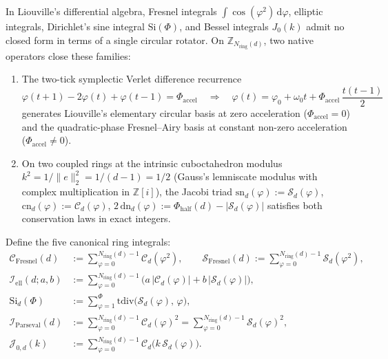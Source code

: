 \documentclass[11pt,a4paper]{article}
\theoremstyle{plain}
\theoremstyle{definition}
\begin{document}
In Liouville's differential algebra, Fresnel integrals $\int\cos(\varphi^2)\,\mathrm{d}\varphi$, elliptic integrals, Dirichlet's sine integral $\mathrm{Si}(\Phi)$, and Bessel integrals $J_0(k)$ admit no closed form in terms of a single circular rotator. On $\mathbb{Z}_{N_{\mathrm{ring}}(d)}$, two native operators close these families:
\begin{enumerate}[leftmargin=*,noitemsep]
\item The two-tick symplectic Verlet difference recurrence
  \begin{equation}
    \label{eq:verlet-parabola}
    \varphi(t+1) - 2\varphi(t) + \varphi(t-1) = \Phi_{\mathrm{accel}}
    \quad\Longrightarrow\quad
    \varphi(t) = \varphi_0 + \omega_0 t + \Phi_{\mathrm{accel}}\,\frac{t(t-1)}{2}
  \end{equation}
  generates Liouville's elementary circular basis at zero acceleration ($\Phi_{\mathrm{accel}}=0$) and the quadratic-phase Fresnel--Airy basis at constant non-zero acceleration ($\Phi_{\mathrm{accel}}\ne 0$).
\item On two coupled rings at the intrinsic cuboctahedron modulus $k^2 = 1/\|e\|_2^2 = 1/(d-1) = 1/2$ (Gauss's lemniscate modulus with complex multiplication in $\mathbb{Z}[i]$), the Jacobi triad $\mathrm{sn}_d(\varphi):=\mathcal{S}_d(\varphi)$, $\mathrm{cn}_d(\varphi):=\mathcal{C}_d(\varphi)$, $2\,\mathrm{dn}_d(\varphi):=\Phi_{\mathrm{half}}(d)-|\mathcal{S}_d(\varphi)|$ satisfies both conservation laws in exact integers.
\end{enumerate}

Define the five canonical ring integrals:
\begin{align}
  \mathcal{C}_{\mathrm{Fresnel}}(d) &:= \sum_{\varphi=0}^{N_{\mathrm{ring}}(d)-1}\mathcal{C}_d(\varphi^2),\qquad
  \mathcal{S}_{\mathrm{Fresnel}}(d) := \sum_{\varphi=0}^{N_{\mathrm{ring}}(d)-1}\mathcal{S}_d(\varphi^2), \label{eq:def-fresnel}\\
  \mathcal{I}_{\mathrm{ell}}(d;a,b) &:= \sum_{\varphi=0}^{N_{\mathrm{ring}}(d)-1}\bigl(a\,|\mathcal{C}_d(\varphi)| + b\,|\mathcal{S}_d(\varphi)|\bigr), \label{eq:def-elliptic}\\
  \mathrm{Si}_d(\Phi) &:= \sum_{\varphi=1}^{\Phi}\mathrm{tdiv}\bigl(\mathcal{S}_d(\varphi),\,\varphi\bigr), \label{eq:def-dirichlet}\\
  \mathcal{I}_{\mathrm{Parseval}}(d) &:= \sum_{\varphi=0}^{N_{\mathrm{ring}}(d)-1}\mathcal{C}_d(\varphi)^2 = \sum_{\varphi=0}^{N_{\mathrm{ring}}(d)-1}\mathcal{S}_d(\varphi)^2, \label{eq:def-parseval}\\
  \mathcal{J}_{0,d}(k) &:= \sum_{\varphi=0}^{N_{\mathrm{ring}}(d)-1}\mathcal{C}_d\bigl(k\,\mathcal{S}_d(\varphi)\bigr). \label{eq:def-bessel}
\end{align}
\end{document}
